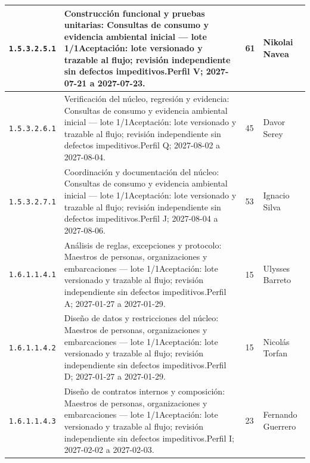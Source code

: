 \begin{longtable}{L{29mm}L{80mm}R{12mm}L{28mm}}
\texttt{1.\allowbreak{}5.\allowbreak{}3.\allowbreak{}2.\allowbreak{}5.\allowbreak{}1} & Construcción funcional y pruebas unitarias: Consultas de consumo y evidencia ambiental inicial — lote 1/1\newline Aceptación: lote versionado y trazable al flujo; revisión independiente sin defectos impeditivos.\newline Perfil V; 2027-07-21 a 2027-07-23. & 61 & Nikolai Navea\\\hline
\texttt{1.\allowbreak{}5.\allowbreak{}3.\allowbreak{}2.\allowbreak{}6.\allowbreak{}1} & Verificación del núcleo, regresión y evidencia: Consultas de consumo y evidencia ambiental inicial — lote 1/1\newline Aceptación: lote versionado y trazable al flujo; revisión independiente sin defectos impeditivos.\newline Perfil Q; 2027-08-02 a 2027-08-04. & 45 & Davor Serey\\\hline
\texttt{1.\allowbreak{}5.\allowbreak{}3.\allowbreak{}2.\allowbreak{}7.\allowbreak{}1} & Coordinación y documentación del núcleo: Consultas de consumo y evidencia ambiental inicial — lote 1/1\newline Aceptación: lote versionado y trazable al flujo; revisión independiente sin defectos impeditivos.\newline Perfil J; 2027-08-04 a 2027-08-06. & 53 & Ignacio Silva\\\hline
\texttt{1.\allowbreak{}6.\allowbreak{}1.\allowbreak{}1.\allowbreak{}4.\allowbreak{}1} & Análisis de reglas, excepciones y protocolo: Maestros de personas, organizaciones y embarcaciones — lote 1/1\newline Aceptación: lote versionado y trazable al flujo; revisión independiente sin defectos impeditivos.\newline Perfil A; 2027-01-27 a 2027-01-29. & 15 & Ulysses Barreto\\\hline
\texttt{1.\allowbreak{}6.\allowbreak{}1.\allowbreak{}1.\allowbreak{}4.\allowbreak{}2} & Diseño de datos y restricciones del núcleo: Maestros de personas, organizaciones y embarcaciones — lote 1/1\newline Aceptación: lote versionado y trazable al flujo; revisión independiente sin defectos impeditivos.\newline Perfil D; 2027-01-27 a 2027-01-29. & 15 & Nicolás Torfan\\\hline
\texttt{1.\allowbreak{}6.\allowbreak{}1.\allowbreak{}1.\allowbreak{}4.\allowbreak{}3} & Diseño de contratos internos y composición: Maestros de personas, organizaciones y embarcaciones — lote 1/1\newline Aceptación: lote versionado y trazable al flujo; revisión independiente sin defectos impeditivos.\newline Perfil I; 2027-02-02 a 2027-02-03. & 23 & Fernando Guerrero\\\hline

\end{longtable}
